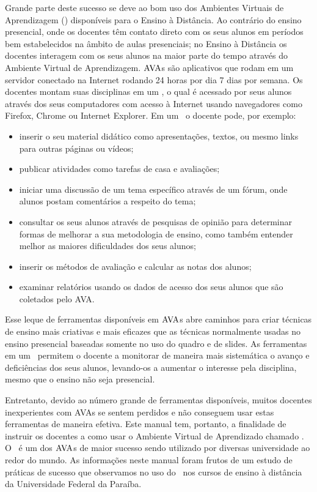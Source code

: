 Grande parte deste sucesso se deve ao bom uso dos Ambientes Virtuais de Aprendizagem (\ava) dispon{\' i}veis para
o Ensino {\`a} Dist{\^ a}ncia. Ao contr{\' a}rio do ensino presencial, onde os docentes têm contato direto 
com os seus alunos em per{\' i}odos bem estabelecidos na {\^ a}mbito de aulas presenciais; 
no Ensino {\`a} Dist{\^ a}ncia os docentes interagem com os seus alunos na maior parte do tempo 
atrav{\'e}s do Ambiente Virtual de Aprendizagem. $\hbox{AVA}$s s{\~ a}o aplicativos que rodam em um servidor 
conectado na Internet rodando 24 horas por dia 7 dias por semana. Os docentes montam suas disciplinas em um \ava, o qual {\'e} acessado 
por seus alunos atrav{\'e}s dos seus computadores com acesso {\`a} Internet usando navegadores como Firefox, Chrome ou Internet Explorer. 
Em um \ava\ o docente pode, por exemplo:
\begin{itemize}
 \item inserir o seu material did{\' a}tico como apresenta{\c c}{\~ o}es, textos, ou mesmo links para outras p{\' a}ginas ou v{\' i}deos;
 \item publicar atividades como tarefas de casa e avalia{\c c}{\~ o}es;
 \item iniciar uma discuss{\~ a}o de um tema espec{\' i}fico atrav{\'e}s de um f\'orum, onde alunos postam coment{\' a}rios a 
 respeito do tema;
 \item consultar os seus alunos atrav{\'e}s de pesquisas de opini{\~ a}o para determinar
formas de melhorar a sua metodologia de ensino, como tamb{\'e}m entender melhor as
maiores dificuldades dos seus alunos;
 \item inserir os m{\'e}todos de avalia{\c c}{\~ a}o e calcular as notas dos alunos;
 \item examinar relat\'orios usando os dados de acesso dos seus alunos que s{\~ a}o 
coletados pelo AVA.
\end{itemize}
Esse leque de ferramentas dispon{\' i}veis em $\hbox{AVA}$s abre caminhos para criar t{\'e}cnicas de ensino 
mais criativas e mais eficazes que as t{\'e}cnicas normalmente usadas no ensino presencial 
baseadas somente no uso do quadro e de slides. As ferramentas em um \ava\ permitem  
o docente a monitorar de maneira mais sistem{\' a}tica o avan{\c c}o e deficiências dos seus alunos, 
levando-os a aumentar o interesse pela disciplina, mesmo que o ensino n{\~ a}o seja presencial. 

Entretanto, devido ao n{\' u}mero grande de ferramentas dispon{\' i}veis, muitos docentes inexperientes
com AVAs se sentem perdidos e n{\~ a}o conseguem usar estas ferramentas de maneira efetiva. 
Este manual tem, portanto, a finalidade de instruir os docentes a como usar o Ambiente Virtual de Aprendizado 
chamado \emph{\moodle}. O \moodle\ {\'e} um dos $\hbox{AVA}$s de maior sucesso sendo utilizado por diversas 
universidade ao redor do mundo. As informa{\c c}{\~ o}es neste manual foram frutos de um 
estudo de pr{\' a}ticas de sucesso que observamos no uso do \moodle\ 
nos cursos de ensino {\`a} dist{\^ a}ncia da Universidade Federal da Para{\' i}ba. 

